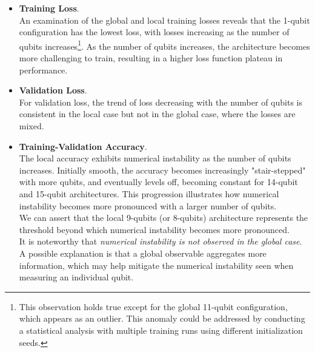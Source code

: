 \begin{itemize}
    \item \textbf{Training Loss}.\\ 
    An examination of the global and local training losses reveals that the 1-qubit configuration 
    has the lowest loss, with losses increasing as the number of qubits 
    increases\footnote[1]{This observation holds true except for the global 11-qubit configuration, 
    which appears as an outlier. This anomaly could be addressed by conducting a statistical analysis 
    with multiple training runs using different initialization seeds.}.
    As the number of qubits increases, the architecture becomes more challenging to train, resulting 
    in a higher loss function plateau in performance.
    \item \textbf{Validation Loss}.\\ 
    For validation loss, the trend of loss decreasing with the number of qubits is consistent 
    in the local case but not in the global case, where the losses are mixed.
    \item \textbf{Training-Validation Accuracy}.\\
    The local accuracy exhibits numerical instability as the number of qubits increases. 
    Initially smooth, the accuracy becomes increasingly "stair-stepped" with more qubits, 
    and eventually levels off, becoming constant for 14-qubit and 15-qubit architectures. 
    This progression illustrates how numerical instability becomes more pronounced with a 
    larger number of qubits.\\
    We can assert that the local 9-qubits (or 8-qubits) architecture represents the threshold beyond which numerical 
    instability becomes more pronounced.\\
    It is noteworthy that \textit{numerical instability is not observed in the global case}. 
    A possible explanation is that a global observable aggregates more information, which may 
    help mitigate the numerical instability seen when measuring an individual qubit.
\end{itemize}







